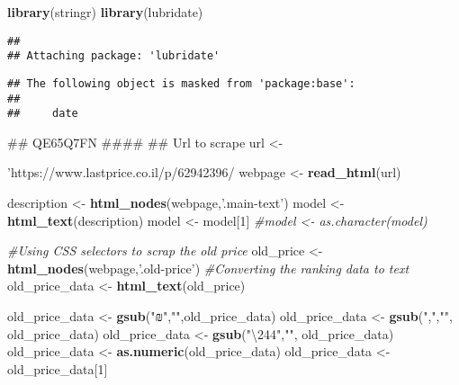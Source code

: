 \documentclass[]{article}
\newenvironment{Shaded}{\begin{snugshade}}{\end{snugshade}}
\newcommand{\KeywordTok}[1]{\textcolor[rgb]{0.13,0.29,0.53}{\textbf{#1}}}
\newcommand{\DecValTok}[1]{\textcolor[rgb]{0.00,0.00,0.81}{#1}}
\newcommand{\StringTok}[1]{\textcolor[rgb]{0.31,0.60,0.02}{#1}}
\newcommand{\CommentTok}[1]{\textcolor[rgb]{0.56,0.35,0.01}{\textit{#1}}}
\newcommand{\NormalTok}[1]{#1}
\begin{document}
\begin{Shaded}
\begin{Highlighting}[]
\KeywordTok{library}\NormalTok{(stringr)   }
\KeywordTok{library}\NormalTok{(lubridate)}
\end{Highlighting}
\end{Shaded}

\begin{verbatim}
## 
## Attaching package: 'lubridate'
\end{verbatim}

\begin{verbatim}
## The following object is masked from 'package:base':
## 
##     date
\end{verbatim}

\begin{Shaded}
\begin{Highlighting}[]
\NormalTok{## QE65Q7FN ####}
\NormalTok{## Url to scrape}
\NormalTok{url <-}\StringTok{'https://www.lastprice.co.il/p/62942396/%D7%98%D7%9C%D7%95%D7%99%D7%96%D7%99%D7%94-65%27-Samsung/Samsung-QE65Q7FN'}
\NormalTok{webpage <-}\StringTok{ }\KeywordTok{read_html}\NormalTok{(url) }

\NormalTok{description <-}\StringTok{ }\KeywordTok{html_nodes}\NormalTok{(webpage,}\StringTok{'.main-text'}\NormalTok{)}
\NormalTok{model <-}\StringTok{ }\KeywordTok{html_text}\NormalTok{(description)}
\NormalTok{model <-}\StringTok{ }\NormalTok{model[}\DecValTok{1}\NormalTok{]}
\CommentTok{#model <- as.character(model)}

\CommentTok{#Using CSS selectors to scrap the old price}
\NormalTok{old_price <-}\StringTok{ }\KeywordTok{html_nodes}\NormalTok{(webpage,}\StringTok{'.old-price'}\NormalTok{)}
\CommentTok{#Converting the ranking data to text }
\NormalTok{old_price_data <-}\StringTok{ }\KeywordTok{html_text}\NormalTok{(old_price)}

\NormalTok{old_price_data <-}\StringTok{ }\KeywordTok{gsub}\NormalTok{(}\StringTok{"₪"}\NormalTok{,}\StringTok{""}\NormalTok{,old_price_data)}
\NormalTok{old_price_data <-}\StringTok{ }\KeywordTok{gsub}\NormalTok{(}\StringTok{","}\NormalTok{,}\StringTok{""}\NormalTok{, old_price_data)}
\NormalTok{old_price_data <-}\StringTok{ }\KeywordTok{gsub}\NormalTok{(}\StringTok{"\textbackslash{}244"}\NormalTok{,}\StringTok{""}\NormalTok{, old_price_data)}
\NormalTok{old_price_data <-}\StringTok{ }\KeywordTok{as.numeric}\NormalTok{(old_price_data)}
\NormalTok{old_price_data <-}\StringTok{ }\NormalTok{old_price_data[}\DecValTok{1}\NormalTok{]}

}
\end{Highlighting}
\end{Shaded}
\end{document}
